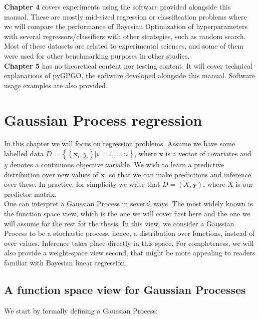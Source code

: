 \documentclass[10pt,a4paper,twoside]{book}
\begin{document}
\textbf{Chapter 4} covers experiments using the software provided alongside this manual. These are mostly mid-sized regression or classification problems where we will compare the performance of Bayesian Optimization of hyperparameters with several regressors/classifiers with other strategies, such as random search. Most of these datasets are related to experimental sciences, and some of them were used for other benchmarking purposes in other studies. \\

\textbf{Chapter 5} has no theoretical content nor testing content. It will cover technical explanations of pyGPGO, the software developed alongside this manual. Software usage examples are also provided. 

\chapter{Gaussian Process regression}

 In this chapter we will focus on regression problems. Assume we have some labelled data $D = \left\lbrace \left(\boldsymbol{x_i}, y_i\right) | i = 1,\dots,n\right\rbrace$, where $\boldsymbol{x}$ is a vector of covariates and $y$ denotes a continuous objective variable. We wish to learn a predictive distribution over new values of $\boldsymbol{x}$, so that we can make predictions and inference over these. In practice, for simplicity we write that $D = \left(X, \boldsymbol{y}\right)$, where $X$ is our predictor matrix.\\

One can interpret a Gaussian Process in several ways. The most widely known is the function space view, which is the one we will cover first here and the one we will assume for the rest for the thesis. In this view, we consider a Gaussian Process to be a stochastic process, hence, a distribution over functions, instead of over values. Inference takes place directly in this space. For completeness, we will also provide a weight-space view second, that might be more appealing to readers familiar with Bayesian linear regression.\\



\section{A function space view for Gaussian Processes}

We start by formally defining a Gaussian Process:
\end{document}
